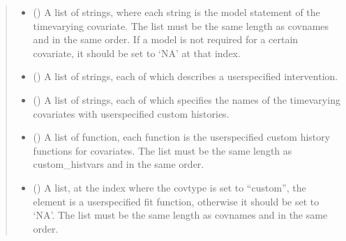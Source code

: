 \documentclass[letterpaper,10pt,english]{sphinxmanual}
\begin{document}
\begin{fulllineitems}
\begin{quote}
\begin{description}
\begin{itemize}
\item {} 
\sphinxAtStartPar
{} (\sphinxstyleliteralemphasis{\sphinxupquote{, }}) \textendash{} A list of strings, where each string is the model statement of the time\sphinxhyphen{}varying covariate. The list
must be the same length as covnames and in the same order. If a model is not required for a certain covariate,
it should be set to ‘NA’ at that index.

\item {} 
\sphinxAtStartPar
{} (\sphinxstyleliteralemphasis{\sphinxupquote{, }}) \textendash{} A list of strings, each of which describes a user\sphinxhyphen{}specified intervention.

\item {} 
\sphinxAtStartPar
{} (\sphinxstyleliteralemphasis{\sphinxupquote{, }}) \textendash{} A list of strings, each of which specifies the names of the time\sphinxhyphen{}varying covariates with user\sphinxhyphen{}specified custom histories.

\item {} 
\sphinxAtStartPar
{} (\sphinxstyleliteralemphasis{\sphinxupquote{, }}) \textendash{} A list of function, each function is the user\sphinxhyphen{}specified custom history functions for covariates. The list
must be the same length as custom\_histvars and in the same order.

\item {} 
\sphinxAtStartPar
{} (\sphinxstyleliteralemphasis{\sphinxupquote{, }}) \textendash{} A list, at the index where the covtype is set to “custom”, the element is a user\sphinxhyphen{}specified fit function,
otherwise it should be set to ‘NA’. The list must be the same length as covnames and in the same order.


\end{itemize}
\end{description}
\end{quote}
\end{fulllineitems}
\end{document}
